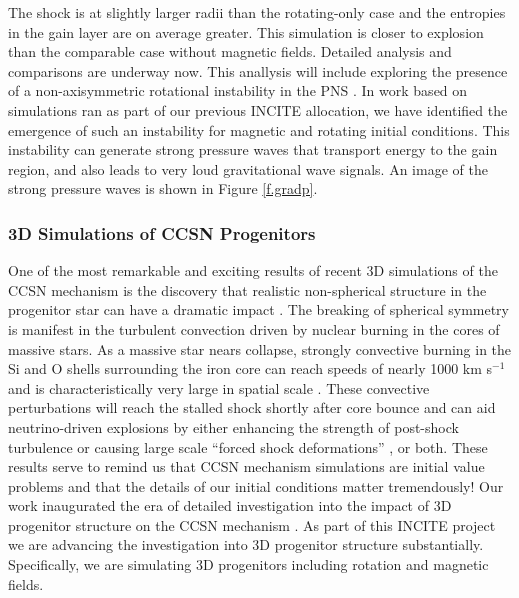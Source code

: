 \documentclass[12pt]{article}
\begin{document}
The shock is at slightly larger radii than the rotating-only case and the entropies in the gain layer are on average greater. 
This simulation is closer to explosion than the comparable case without magnetic fields. 
Detailed analysis and comparisons are underway now.
This anallysis will include exploring the presence of a non-axisymmetric rotational instability in the PNS \citep{wheeler:2007, ott:2005}. 
In work based on simulations ran as part of our previous INCITE allocation, we have identified the emergence of such an instability for magnetic and rotating initial conditions. 
This instability can generate strong pressure waves that transport energy to the gain region, and also leads to very loud gravitational wave signals.
An image of the strong pressure waves is shown in Figure \ref{f.gradp}.

\subsubsection{3D Simulations of CCSN Progenitors}

One of the most remarkable and exciting results of recent 3D simulations of the CCSN mechanism is the discovery that  realistic non-spherical structure in the progenitor star can have a dramatic impact \citep{couch:2013b, couch:2015, couch:2015a, muller:2015, muller:2017, oconnor:2018b}.
The breaking of spherical symmetry is manifest in the turbulent convection driven by nuclear burning in the cores of massive stars.
As a massive star nears collapse, strongly convective burning in the Si and O shells surrounding the iron core can reach speeds of nearly 1000 km s$^{-1}$ and is characteristically very large in spatial scale \citep{Arnett:2011, couch:2015a, muller:2016a}.
These convective perturbations will reach the stalled shock shortly after core bounce and can aid neutrino-driven explosions by either enhancing the strength of post-shock turbulence \citep{couch:2015} or causing large scale ``forced shock deformations'' \citep{muller:2017}, or both.
These results serve to remind us that CCSN mechanism simulations are initial value problems and that the details of our initial conditions matter tremendously!
Our work inaugurated the era of detailed investigation into the impact of 3D progenitor structure on the CCSN mechanism \citep{couch:2013b, couch:2015a}.
As part of this INCITE project we are advancing the investigation into 3D progenitor structure substantially.
Specifically, we are simulating 3D progenitors including rotation and magnetic fields.
\end{document}
